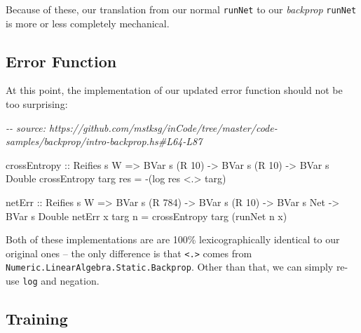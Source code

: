 \documentclass[]{article}
\newenvironment{Shaded}{}{}
\newcommand{\CommentTok}[1]{\textcolor[rgb]{0.38,0.63,0.69}{\textit{#1}}}
\newcommand{\DataTypeTok}[1]{\textcolor[rgb]{0.56,0.13,0.00}{#1}}
\newcommand{\DecValTok}[1]{\textcolor[rgb]{0.25,0.63,0.44}{#1}}
\newcommand{\FunctionTok}[1]{\textcolor[rgb]{0.02,0.16,0.49}{#1}}
\newcommand{\NormalTok}[1]{#1}
\newcommand{\OperatorTok}[1]{\textcolor[rgb]{0.40,0.40,0.40}{#1}}
\newcommand{\OtherTok}[1]{\textcolor[rgb]{0.00,0.44,0.13}{#1}}
\begin{document}
Because of these, our translation from our normal \texttt{runNet} to our
\emph{backprop} \texttt{runNet} is more or less completely mechanical.

\subsection{Error Function}\label{error-function-1}

At this point, the implementation of our updated error function should not be
too surprising:

\begin{Shaded}
\begin{Highlighting}[]
\CommentTok{{-}{-} source: https://github.com/mstksg/inCode/tree/master/code{-}samples/backprop/intro{-}backprop.hs\#L64{-}L87}

\NormalTok{crossEntropy}
\OtherTok{    ::} \DataTypeTok{Reifies}\NormalTok{ s }\DataTypeTok{W}
    \OtherTok{=\textgreater{}} \DataTypeTok{BVar}\NormalTok{ s (}\DataTypeTok{R} \DecValTok{10}\NormalTok{)}
    \OtherTok{{-}\textgreater{}} \DataTypeTok{BVar}\NormalTok{ s (}\DataTypeTok{R} \DecValTok{10}\NormalTok{)}
    \OtherTok{{-}\textgreater{}} \DataTypeTok{BVar}\NormalTok{ s }\DataTypeTok{Double}
\NormalTok{crossEntropy targ res }\OtherTok{=} \OperatorTok{{-}}\NormalTok{(}\FunctionTok{log}\NormalTok{ res }\OperatorTok{\textless{}.\textgreater{}}\NormalTok{ targ)}

\NormalTok{netErr}
\OtherTok{    ::} \DataTypeTok{Reifies}\NormalTok{ s }\DataTypeTok{W}
    \OtherTok{=\textgreater{}} \DataTypeTok{BVar}\NormalTok{ s (}\DataTypeTok{R} \DecValTok{784}\NormalTok{)}
    \OtherTok{{-}\textgreater{}} \DataTypeTok{BVar}\NormalTok{ s (}\DataTypeTok{R} \DecValTok{10}\NormalTok{)}
    \OtherTok{{-}\textgreater{}} \DataTypeTok{BVar}\NormalTok{ s }\DataTypeTok{Net}
    \OtherTok{{-}\textgreater{}} \DataTypeTok{BVar}\NormalTok{ s }\DataTypeTok{Double}
\NormalTok{netErr x targ n }\OtherTok{=}\NormalTok{ crossEntropy targ (runNet n x)}
\end{Highlighting}
\end{Shaded}

Both of these implementations are are 100\% lexicographically identical to our
original ones -- the only difference is that \texttt{\textless{}.\textgreater{}}
comes from \texttt{Numeric.LinearAlgebra.Static.Backprop}. Other than that, we
can simply re-use \texttt{log} and negation.

\subsection{Training}\label{training-1}
\end{document}
